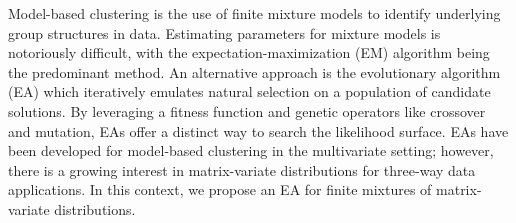 
Model-based clustering is the use of finite mixture models to identify underlying group structures in data. Estimating parameters for mixture models is notoriously difficult, with the expectation-maximization (EM) algorithm being the predominant method. An alternative approach is the evolutionary algorithm (EA) which iteratively emulates natural selection on a population of candidate solutions. By leveraging a fitness function and genetic operators like crossover and mutation, EAs offer a distinct way to search the likelihood surface. EAs have been developed for model-based clustering in the multivariate setting; however, there is a growing interest in matrix-variate distributions for three-way data applications. In this context, we propose an EA for finite mixtures of matrix-variate distributions.